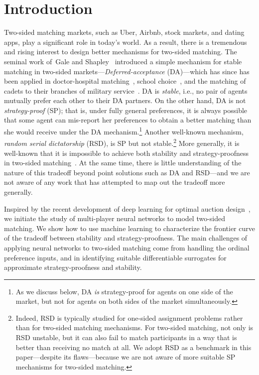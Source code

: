 \documentclass[11pt,letterpaper]{article}
\theoremstyle{definition}
\newcommand{\kibitz}[2]{\ifnum\Comments=1{\color{#1}{#2}}\fi}
\newcommand{\todo}[1]{\kibitz{blue}{[TODO: #1]}}
\newcommand{\dcpadd}[1]{{#1}}
\begin{document}
\section{Introduction}
  
Two-sided matching markets, such as Uber, Airbnb,  stock markets, and dating apps, play a significant role in today's world. As a result, there is a tremendous and rising interest to design better mechanisms for two-sided matching. The seminal work of~Gale and Shapley~\cite{GS62} introduced a simple mechanism for stable matching in two-sided markets---\emph{Deferred-acceptance} (DA)---which has since has been applied in doctor-hospital matching~\cite{RothPeranson99}, school choice~\cite{abdulkadiroglu2003school,pathak2008leveling,APR2009}, and the matching of cadets to their branches of military service~\cite{sonmez2011matching,sonmez2011bidding}.
DA is \emph{stable}, i.e., no pair of agents mutually prefer each other to their DA partners. 
On the other hand, DA is not \emph{strategy-proof} (SP); that is, under fully general preferences, it is always possible that some agent can mis-report her preferences to obtain a better matching than she would receive under the DA mechanism.\footnote{As we discuss below, DA \textit{is} strategy-proof for agents on one side of the market, but not for agents on both sides of the market simultaneously.} 
%
Another well-known  mechanism, \emph{random serial dictatorship} (RSD), is SP but not stable.\footnote{\dcpadd{Indeed, RSD is typically studied for one-sided assignment problems rather than for two-sided matching mechanisms. For two-sided matching, not only is RSD unstable, but it can also fail to match participants in a way that is better than receiving no match at all. We adopt RSD as a benchmark in this paper---despite its flaws---because we are not aware of more suitable SP mechanisms for two-sided matching.}} More generally, it is well-known that it is impossible to achieve both stability and strategy-proofness in two-sided matching~\cite{DubinsFreeman1981,Roth82}. At the same time, there is little understanding of the nature of this tradeoff beyond point solutions such as DA and RSD---and we are not aware of any work that has attempted to map out the tradeoff
more generally. 
%


Inspired by the recent development of deep learning for optimal auction design~\cite{deep-auction19,curry2020certifying,STZ19,rahme2020permutationequivariant}, we initiate the study of multi-player neural networks to model two-sided matching.
We show how to use machine learning to characterize the frontier curve of the tradeoff between stability and strategy-proofness.
%
The main challenges of applying neural networks to two-sided matching come from handling the ordinal preference inputs, and in identifying suitable differentiable surrogates for approximate strategy-proofness and stability.
%
\end{document}
